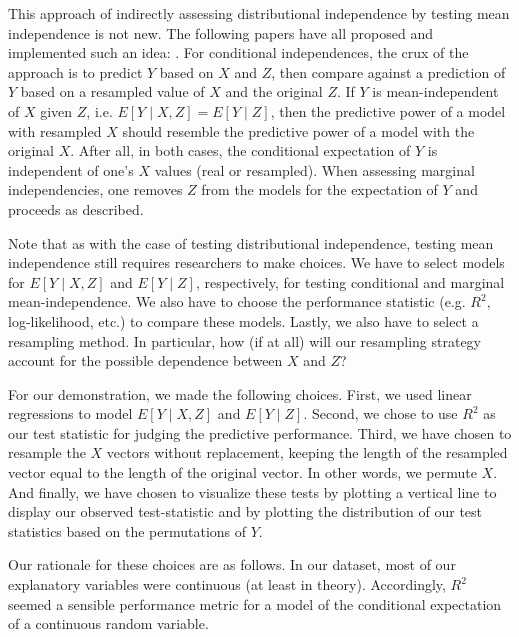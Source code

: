 This approach of indirectly assessing distributional independence by testing mean independence is not new.
The following papers have all proposed and implemented such an idea: \citet{burkart_2017_predictive, chalupka_2018_fast, inacio_2019_conditional}.
For conditional independences, the crux of the approach is to predict $Y$ based on $X$ and $Z$, then compare against a prediction of $Y$ based on a resampled value of $X$ and the original $Z$.
If $Y$ is mean-independent of $X$ given $Z$, i.e. $E \left[ Y \mid X, Z \right] = E\left[ Y \mid Z \right]$, then the predictive power of a model with resampled $X$ should resemble the predictive power of a model with the original $X$.
After all, in both cases, the conditional expectation of $Y$ is independent of one's $X$ values (real or resampled).
When assessing marginal independencies, one removes $Z$ from the models for the expectation of $Y$ and proceeds as described.

Note that as with the case of testing distributional independence, testing mean independence still requires researchers to make choices.
We have to select models for $E \left[ Y \mid X, Z \right]$ and $E\left[ Y \mid Z \right]$, respectively, for testing conditional and marginal mean-independence.
We also have to choose the performance statistic (e.g. $R^2$, log-likelihood, etc.) to compare these models.
Lastly, we also have to select a resampling method.
In particular, how (if at all) will our resampling strategy account for the possible dependence between $X$ and $Z$?

For our demonstration, we made the following choices.
First, we used linear regressions to model $E \left[Y \mid X, Z \right]$ and $E \left[ Y \mid Z \right]$.
Second, we chose to use $R^2$ as our test statistic for judging the predictive performance.
Third, we have chosen to resample the $X$ vectors without replacement, keeping the length of the resampled vector equal to the length of the original vector.
In other words, we permute $X$.
And finally, we have chosen to visualize these tests by plotting a vertical line to display our observed test-statistic and by plotting the distribution of our test statistics based on the permutations of $Y$.

Our rationale for these choices are as follows.
In our dataset, most of our explanatory variables were continuous (at least in theory).
Accordingly, $R^2$ seemed a sensible performance metric for a model of the conditional expectation of a continuous random variable.


